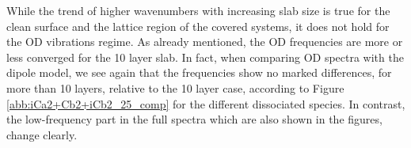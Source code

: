 \documentclass[11pt,DIV=13,BCOR=5mm,a4paper,headinclude]{scrbook}
\begin{document}
While the trend of higher wavenumbers with increasing slab size is true for the clean surface and the lattice region of the covered systems, it does not hold for the OD vibrations regime.
As already mentioned, the OD frequencies are more or less converged for the 10 layer slab.
In fact, when comparing OD spectra with the dipole model, we see again that the frequencies show no marked differences, for more than 10 layers, relative to the 10 layer case, according to Figure \ref{abb:iCa2+Cb2+iCb2_25_comp} for the different dissociated species.
In contrast, the low-frequency part in the full spectra which are also shown in the figures, change clearly.
\begin{figure}[!h]
    \centering
             \quad
             \quad

\end{figure}
\end{document}
